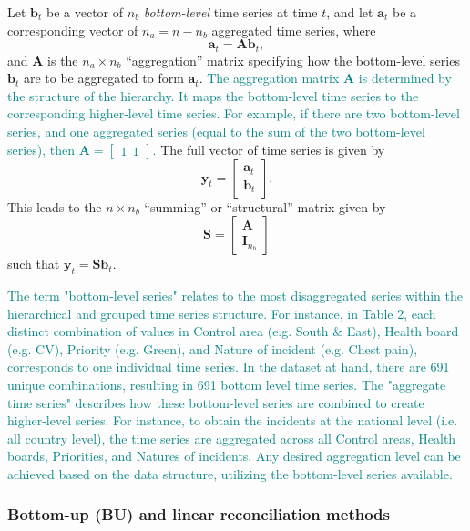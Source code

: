 \documentclass[
  authoryear,
  preprint,
  3p]{elsarticle}
\begin{document}
Let \(\bm{b}_t\) be a vector of \(n_b\) \emph{bottom-level} time series
at time \(t\), and let \(\bm{a}_t\) be a corresponding vector of
\(n_a = n-n_b\) aggregated time series, where \[
  \bm{a}_t = \bm{A}\bm{b}_t,
\] and \(\bm{A}\) is the \(n_a\times n_b\) ``aggregation'' matrix
specifying how the bottom-level series \(\bm{b}_t\) are to be aggregated
to form \(\bm{a}_t\).
\textcolor{teal}{The aggregation matrix $\bm{A}$ is determined by the structure of the hierarchy. It maps the bottom-level time series to the corresponding higher-level time series. For example, if there are two bottom-level series, and one aggregated series (equal to the sum of the two bottom-level series), then $\bm{A} = \begin{bmatrix} 1 ~~ 1 \end{bmatrix}$.
} The full vector of time series is given by \[
 \bm{y}_t = \begin{bmatrix}\bm{a}_t \\\bm{b}_t\end{bmatrix}.
\] This leads to the \(n\times n_b\) ``summing'' or ``structural''
matrix given by \[
  \bm{S} = \begin{bmatrix}\bm{A} \\ \bm{I}_{n_b}\end{bmatrix}
\] such that \(\bm{y}_t = \bm{S}\bm{b}_t\).

\textcolor{teal}{The term "bottom-level series" relates to the most disaggregated series within the hierarchical and grouped time series structure. For instance, in Table 2, each distinct combination of values in Control area (e.g. South \& East), Health board (e.g. CV), Priority (e.g. Green), and Nature of incident (e.g. Chest pain), corresponds to one individual time series. In the dataset at hand, there are 691 unique combinations, resulting in 691 bottom level time series. The "aggregate time series" describes how these bottom-level series are combined to create higher-level series. For instance, to obtain the incidents at the national level (i.e. all country level), the time series are aggregated across all Control areas, Health boards, Priorities, and Natures of incidents. Any desired aggregation level can be achieved based on the data structure, utilizing the bottom-level series available.}

\hypertarget{bottom-up-bu-and-linear-reconciliation-methods}{%
\subsubsection{Bottom-up (BU) and linear reconciliation
methods}\label{bottom-up-bu-and-linear-reconciliation-methods}}
\end{document}
